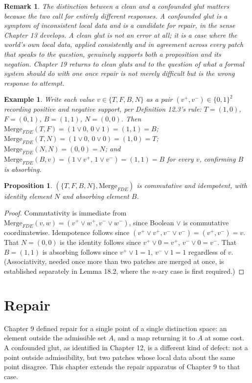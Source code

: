 \documentclass[11pt]{book}
\newtheorem{proposition}[theorem]{Proposition}
\newtheorem{remark}[theorem]{Remark}
\newtheorem{example}[theorem]{Example}
\begin{document}
\begin{remark}
The distinction between a clean and a confounded glut matters because the two call for entirely different responses. A confounded glut is a symptom of inconsistent local data and is a candidate for repair, in the sense Chapter 13 develops. A clean glut is not an error at all; it is a case where the world's own local data, applied consistently and in agreement across every patch that speaks to the question, genuinely supports both a proposition and its negation. Chapter 19 returns to clean gluts and to the question of what a formal system should do with one once repair is not merely difficult but is the wrong response to attempt.
\end{remark}

\begin{example}
Write each value $v \in \{T,F,B,N\}$ as a pair $(v^+,v^-) \in \{0,1\}^2$ recording positive and negative support, per Definition 12.3's rule: $T=(1,0)$, $F=(0,1)$, $B=(1,1)$, $N=(0,0)$. Then $\mathrm{Merge}_{FDE}(T,F) = (1\vee0,\,0\vee1) = (1,1) = B$; $\mathrm{Merge}_{FDE}(T,N) = (1\vee0,\,0\vee0) = (1,0) = T$; $\mathrm{Merge}_{FDE}(N,N) = (0,0) = N$; and $\mathrm{Merge}_{FDE}(B,v) = (1\vee v^+,\,1\vee v^-) = (1,1) = B$ for every $v$, confirming $B$ is absorbing.
\end{example}

\begin{proposition}
$(\{T,F,B,N\}, \mathrm{Merge}_{FDE})$ is commutative and idempotent, with identity element $N$ and absorbing element $B$.
\end{proposition}

\begin{proof}
Commutativity is immediate from $\mathrm{Merge}_{FDE}(v,w) = (v^+\vee w^+, v^-\vee w^-)$, since Boolean $\vee$ is commutative coordinatewise. Idempotence follows since $(v^+\vee v^+, v^-\vee v^-) = (v^+,v^-) = v$. That $N=(0,0)$ is the identity follows since $v^+\vee0=v^+$, $v^-\vee0=v^-$. That $B=(1,1)$ is absorbing follows since $v^+\vee1=1$, $v^-\vee1=1$ regardless of $v$. (Associativity, needed once more than two patches are merged at once, is established separately in Lemma 18.2, where the $n$-ary case is first required.)
\end{proof}

\chapter{Repair}

Chapter 9 defined repair for a single point of a single distinction space: an element outside the admissible set $A$, and a map returning it to $A$ at some cost. A confounded glut, as identified in Chapter 12, is a different kind of defect: not a point outside admissibility, but two patches whose local data about the same point disagree. This chapter extends the repair apparatus of Chapter 9 to that case.
\end{document}
